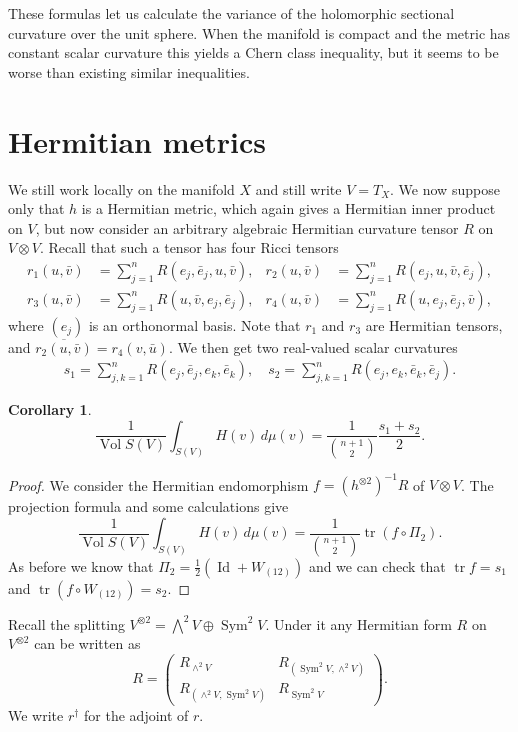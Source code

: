 \documentclass[10pt,a4paper]{amsart}
\newtheorem{coro}[theo]{Corollary}
\theoremstyle{definition}
\def\ov#1{\overline{#1}}
\def\d{\,d}
\DeclareMathOperator{\Sym}{Sym}
\DeclareMathOperator{\id}{Id}
\DeclareMathOperator{\tr}{tr}
\DeclareMathOperator{\Vol}{Vol}
\begin{document}
These formulas let us calculate the variance of the holomorphic sectional
curvature over the unit sphere.
When the manifold is compact and the metric has constant scalar curvature this
yields a Chern class inequality, but it seems to be worse than existing similar
inequalities.


\section{Hermitian metrics}

We still work locally on the manifold $X$ and still write $V = T_X$.
We now suppose only that $h$ is a Hermitian metric, which again gives a
Hermitian inner product on $V$, but now consider an arbitrary algebraic
Hermitian curvature tensor $R$ on $V \otimes V$.
Recall that such a tensor has four Ricci tensors
\begin{align*}
r_1(u, \bar v) &= \sum_{j=1}^n R(e_j, \bar e_j, u, \bar v),
	       &
r_2(u, \bar v) &= \sum_{j=1}^n R(e_j, u, \bar v, \bar e_j),
\\
r_3(u, \bar v) &= \sum_{j=1}^n R(u, \bar v, e_j, \bar e_j),
	       &
r_4(u, \bar v) &= \sum_{j=1}^n R(u, e_j, \bar e_j, \bar v),
\end{align*}
where $(e_j)$ is an orthonormal basis.
Note that $r_1$ and $r_3$ are Hermitian tensors, and
$\ov{r_2(u, \bar v)} = r_4(v, \bar u)$.
We then get two real-valued scalar curvatures
\begin{align*}
s_1 = \sum_{j,k=1}^n R(e_j, \bar e_j, e_k, \bar e_k),
\quad
s_2 = \sum_{j,k=1}^n R(e_j, e_k, \bar e_k, \bar e_j).
\end{align*}

\begin{coro}
$$
\frac{1}{\Vol S(V)} \int_{S(V)}
\!\!\!
H(v)  \d\mu(v)
= \frac{1}{\binom{n+1}{2}} \frac{s_1 + s_2}{2} .
$$
\end{coro}


\begin{proof}
We consider the Hermitian endomorphism $f = (h^{\otimes 2})^{-1} R$ of $V
\otimes V$.
The projection formula and some calculations give
$$
\frac{1}{\Vol S(V)} \int_{S(V)}
\!\!\!
H(v)  \d\mu(v)
= \frac{1}{\binom{n+1}{2}} \tr(f \circ \Pi_2).
$$
As before we know that $\Pi_2 = \frac12(\id + W_{(12)})$
and we can check that $\tr f = s_1$ and $\tr(f \circ W_{(12)}) = s_2$.
\end{proof}

Recall the splitting $V^{\otimes 2} = \bigwedge^2 V \oplus \Sym^2 V$.
Under it any Hermitian form $R$ on $V^{\otimes 2}$ can be written as
$$
R = \begin{pmatrix}
R_{\wedge^2 V} & R_{(\Sym^2V, \wedge^2 V)}
\\
R_{(\wedge^2 V, \Sym^2V)} & R_{\Sym^2 V}
\end{pmatrix}.
$$
We write $r^\dagger$ for the adjoint of $r$.
\end{document}
